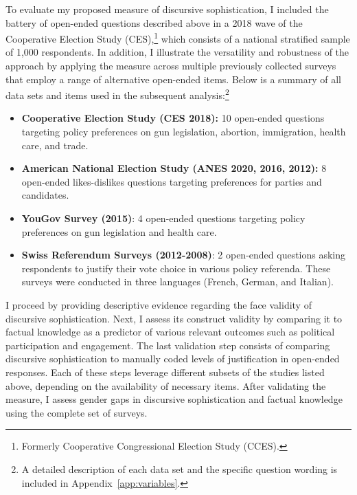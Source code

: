 To evaluate my proposed measure of discursive sophistication, I included the battery of open-ended questions described above in a 2018 wave of the Cooperative Election Study (CES),\footnote{Formerly Cooperative Congressional Election Study (CCES).} which consists of a national stratified sample of 1,000 respondents. In addition, I illustrate the versatility and robustness of the approach by applying the measure across multiple previously collected surveys that employ a range of alternative open-ended items. Below is a summary of all data sets and items used in the subsequent analysis:\footnote{A detailed description of each data set and the specific question wording is included in Appendix~\ref{app:variables}.}

\begin{itemize}\singlespacing
	\item \textbf{Cooperative Election Study (CES 2018):} 10 open-ended questions targeting policy preferences on gun legislation, abortion, immigration, health care, and trade.
	\item \textbf{American National Election Study (ANES 2020, 2016, 2012):} 8 open-ended likes-dislikes questions targeting preferences for parties and candidates.
	\item \textbf{YouGov Survey (2015)}: 4 open-ended questions targeting policy preferences on gun legislation and health care.
	\item \textbf{Swiss Referendum Surveys (2012-2008)}: 2 open-ended questions asking respondents to justify their vote choice in various policy referenda. These surveys were conducted in three languages (French, German, and Italian).
\end{itemize}


I proceed by providing descriptive evidence regarding the face validity of discursive sophistication. Next, I assess its construct validity by comparing it to factual knowledge as a predictor of various relevant outcomes such as political participation and engagement. The last validation step consists of comparing discursive sophistication to manually coded levels of justification in open-ended responses. Each of these steps leverage different subsets of the studies listed above, depending on the availability of necessary items. After validating the measure, I assess gender gaps in discursive sophistication and factual knowledge using the complete set of surveys.


